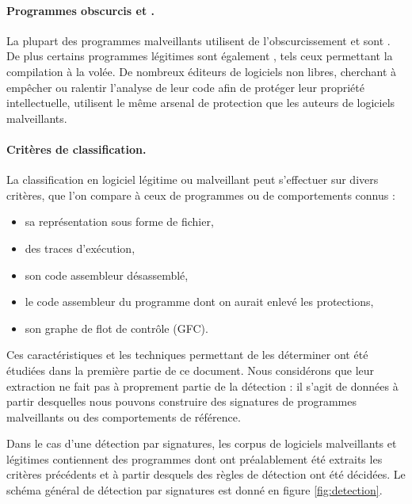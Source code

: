 \paragraph{Programmes obscurcis et \sms.}
La plupart des programmes malveillants utilisent de l'obscurcissement et sont \sms.
De plus certains programmes légitimes sont également \sms, tels ceux permettant la compilation à la volée.
De nombreux éditeurs de logiciels non libres, cherchant à empêcher ou ralentir l'analyse de leur code afin de protéger leur propriété intellectuelle, utilisent le même arsenal de protection que les auteurs de logiciels malveillants.

\paragraph{Critères de classification.}
La classification en logiciel légitime ou malveillant peut s'effectuer sur divers critères, que l'on compare à ceux de programmes ou de comportements connus :
\begin{itemize}
 \item sa représentation sous forme de fichier,
 \item des traces d'exécution,
 \item son code assembleur désassemblé,
 \item le code assembleur du programme dont on aurait enlevé les protections,
 \item son graphe de flot de contrôle (GFC).
\end{itemize}

Ces caractéristiques et les techniques permettant de les déterminer ont été étudiées dans la première partie de ce document.
Nous considérons que leur extraction ne fait pas à proprement partie de la détection : il s'agit de données à partir desquelles nous pouvons construire des signatures de programmes malveillants ou des comportements de référence.

Dans le cas d'une détection par signatures, les corpus de logiciels malveillants et légitimes contiennent des programmes dont ont préalablement été extraits les critères précédents et à partir desquels des règles de détection ont été décidées.
Le schéma général de détection par signatures est donné en figure \ref{fig:detection}.

